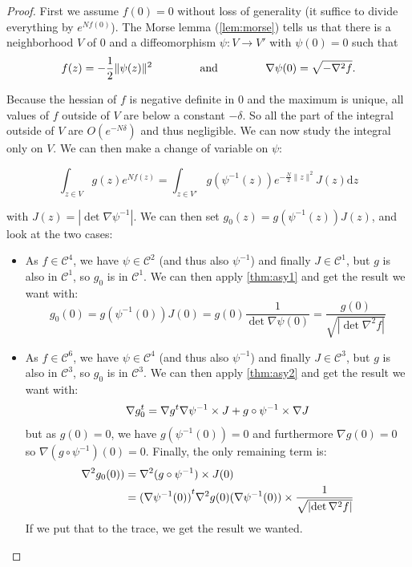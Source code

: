 \documentclass[10pt,a4paper]{report}
\theoremstyle{plain}
\theoremstyle{definition}
\theoremstyle{remark}
\newcommand{\dd}{\mathrm{d}}
\newcommand{\class}[1]{{\mathscr{C}^{#1}}}
\newcommand{\gap}{\hspace{1.5cm}}
\begin{document}
\begin{proof}
First we assume $f(0) = 0$ without loss of generality (it suffice to divide
everything by $e^{Nf(0)}$). The Morse lemma (\ref{lem:morse}) tells us that
there is a  neighborhood $V$ of 0 and
a diffeomorphism $\psi : V \to V'$ with $\psi(0) = 0$ such that
\[f(z) = - \frac12 \|\psi(z)\|^2 \gap \text{and}\gap \nabla \psi(0) =
  \sqrt{-\nabla^2 f}.\]

Because the hessian of $f$ is negative definite in 0 and the maximum is unique,
all values of $f$ outside of $V$ are below a
constant $-\delta$. So all the part of the integral outside of $V$ are
$O(e^{-N\delta})$ and thus negligible. We can now study the integral only on
$V$. We can then make a change of variable on $\psi$:

\[\int_{z \in V} g(z)e^{Nf(z)} = \int_{z \in V'}
  g(\psi^{-1}(z))e^{-\frac N2\|z\|^2} J(z) \dd z\]

with $J(z) = |\det{\nabla \psi^{-1}}|$. We can then set $g_0(z) =
g(\psi^{-1}(z))J(z)$, and look at the two cases:
\begin{itemize}
  \item As $f \in \class 4$, we have $\psi \in \class 2$ (and thus also
    $\psi^{-1}$) and finally $J \in \class 1$, but $g$ is also in $\class 1$, so
    $g_0$ is in $\class 1$. We can then apply \cref{thm:asy1} and get the result
    we want with:
\[g_0(0) = g(\psi^{-1}(0))J(0) = g(0)\frac 1 {\det {\nabla \psi(0)}} =
  \frac {g(0)}{\sqrt{\left|\det \nabla^2 f\right|}}
  \]


  \item As $f \in \class 6$, we have $\psi \in \class 4$ (and thus also
    $\psi^{-1}$) and finally $J \in \class 3$, but $g$ is also in $\class 3$, so
    $g_0$ is in $\class 3$. We can then apply \cref{thm:asy2} and get the result
    we want with:
    \[\nabla g_0^t = \nabla g^t \nabla \psi^{-1} \times J + g \circ \psi^{-1}
      \times \nabla J\]
    but as $g(0) = 0$, we have $g(\psi^{-1}(0)) = 0$ and furthermore $\nabla
    g(0) = 0$ so $\nabla (g \circ \psi^{-1})(0) = 0$. Finally, the only remaining term is:
    \begin{align*}
      \nabla^2 g_0(0))
      &= \nabla^2 (g \circ \psi^{-1}) \times J(0)\\
      &= {(\nabla \psi^{-1}(0))}^t\nabla^2 g(0) {(\nabla \psi^{-1}(0))} \times
         \frac {1}{\sqrt{\left|\det \nabla^2 f\right|}}
    \end{align*}
    If we put that to the trace, we get the result we wanted.
\end{itemize}

\end{proof}
\end{document}
